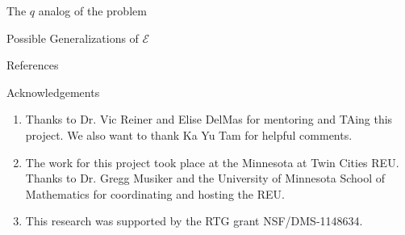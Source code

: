 \documentclass{beamer}
\theoremstyle{remark}
\begin{document}
\begin{frame}{The $q$ analog of the problem}

\end{frame}

\begin{frame}{Possible Generalizations of $\mathcal{E}$}

\end{frame}




\begin{frame}{References}
\nocite{quotients_stanley}
\nocite{algebraic_stanley}
\nocite{pak}


\end{frame}


\begin{frame}{Acknowledgements}
\begin{enumerate}
\item Thanks to Dr. Vic Reiner and Elise DelMas for mentoring and TAing this project. We also want to thank Ka Yu Tam for helpful comments. 
\item The work for this project took place at the Minnesota at Twin Cities REU.  Thanks to Dr. Gregg Musiker and the University of Minnesota School of Mathematics for coordinating and hosting the REU.
\item This research was supported by the RTG grant NSF/DMS-1148634.
\end{enumerate}
\end{frame}
\end{document}
